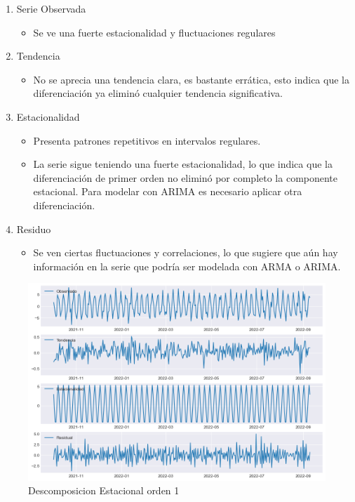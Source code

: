 \begin{enumerate}
	\item	Serie Observada
	\begin{itemize}
		\item Se ve una fuerte estacionalidad y fluctuaciones regulares
	\end{itemize}
	\item Tendencia
	\begin{itemize}
		\item No se aprecia una tendencia clara, es bastante errática, esto indica que la diferenciación ya eliminó cualquier tendencia significativa.
	\end{itemize}
	\item Estacionalidad
	\begin{itemize}
		\item Presenta patrones repetitivos en intervalos regulares.
		\item  La serie sigue teniendo una fuerte estacionalidad, lo que indica que la diferenciación de primer orden no eliminó por completo la componente estacional. Para modelar con ARIMA es necesario aplicar otra diferenciación.
	\end{itemize}
	\item Residuo
	\begin{itemize}
		\item Se ven ciertas fluctuaciones y correlaciones, lo que sugiere que aún hay información en la serie que podría ser modelada con ARMA o ARIMA.		
	\end{itemize}
\end{enumerate}

\begin{figure}[h]
	\centering
	\includegraphics[width=0.7\linewidth]{seasonal_decompose_plot_diff}
	\caption{Descomposicion Estacional orden 1}
	\label{fig:seasonaldecomposeplotdiff}
\end{figure}



